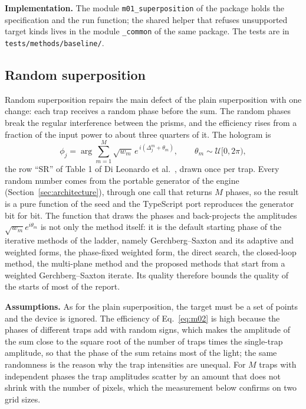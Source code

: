 \textbf{Implementation.} The module \texttt{m01\_superposition} of the package  holds the specification and the run function; the shared helper that refuses unsupported target kinds lives in the module \texttt{\_common} of the same package. The tests are in \texttt{tests/methods/baseline/}.

\subsection{Random superposition}\label{sec:m02}

Random superposition repairs the main defect of the plain superposition with one change: each trap receives a random phase before the sum. The random phases break the regular interference between the prisms, and the efficiency rises from a fraction of the input power to about three quarters of it. The hologram is
\begin{equation}
\phi_j=\arg\sum_{m=1}^{M}\sqrt{w_m}\,e^{\,i(\Delta_j^m+\theta_m)},\qquad \theta_m\sim\mathcal U[0,2\pi),
\label{eq:m02}
\end{equation}
the row ``SR'' of Table 1 of Di Leonardo et al.~\cite{dileonardo}, drawn once per trap. Every random number comes from the portable generator of the engine (Section~\ref{sec:architecture}), through one call that returns $M$ phases, so the result is a pure function of the seed and the TypeScript port reproduces the generator bit for bit. The function that draws the phases and back-projects the amplitudes $\sqrt{w_m}e^{i\theta_m}$ is not only the method itself: it is the default starting phase of the iterative methods of the ladder, namely Gerchberg--Saxton and its adaptive and weighted forms, the phase-fixed weighted form, the direct search, the closed-loop method, the multi-plane method and the proposed methods that start from a weighted Gerchberg--Saxton iterate. Its quality therefore bounds the quality of the starts of most of the report.

\textbf{Assumptions.} As for the plain superposition, the target must be a set of points and the device is ignored. The efficiency of Eq.~\eqref{eq:m02} is high because the phases of different traps add with random signs, which makes the amplitude of the sum close to the square root of the number of traps times the single-trap amplitude, so that the phase of the sum retains most of the light; the same randomness is the reason why the trap intensities are unequal. For $M$ traps with independent phases the trap amplitudes scatter by an amount that does not shrink with the number of pixels, which the measurement below confirms on two grid sizes.


